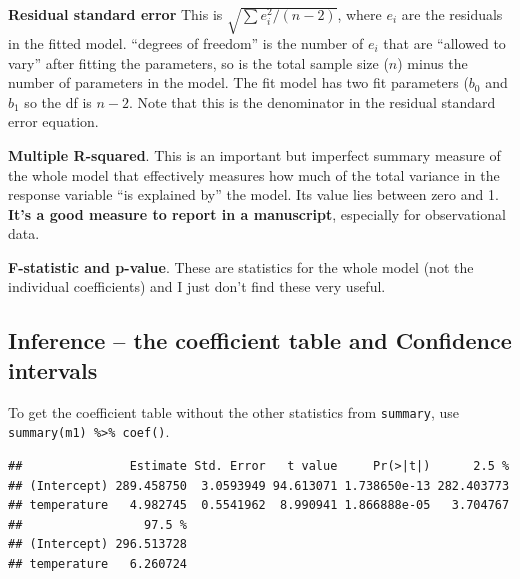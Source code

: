 \documentclass[]{book}
\newenvironment{Shaded}{\begin{snugshade}}{\end{snugshade}}
\newcommand{\KeywordTok}[1]{\textcolor[rgb]{0.13,0.29,0.53}{\textbf{#1}}}
\newcommand{\NormalTok}[1]{#1}
\newcommand{\OperatorTok}[1]{\textcolor[rgb]{0.81,0.36,0.00}{\textbf{#1}}}
\newcommand{\StringTok}[1]{\textcolor[rgb]{0.31,0.60,0.02}{#1}}
\begin{document}
\textbf{Residual standard error} This is \(\sqrt{\sum{e_i^2}/(n-2)}\), where \(e_i\) are the residuals in the fitted model. ``degrees of freedom'' is the number of \(e_i\) that are ``allowed to vary'' after fitting the parameters, so is the total sample size (\(n\)) minus the number of parameters in the model. The fit model has two fit parameters (\(b_0\) and \(b_1\) so the df is \(n-2\). Note that this is the denominator in the residual standard error equation.

\textbf{Multiple R-squared}. This is an important but imperfect summary measure of the whole model that effectively measures how much of the total variance in the response variable ``is explained by'' the model. Its value lies between zero and 1. \textbf{It's a good measure to report in a manuscript}, especially for observational data.

\textbf{F-statistic and p-value}. These are statistics for the whole model (not the individual coefficients) and I just don't find these very useful.

\hypertarget{inference-the-coefficient-table-and-confidence-intervals}{%
\subsection{Inference -- the coefficient table and Confidence intervals}\label{inference-the-coefficient-table-and-confidence-intervals}}

To get the coefficient table without the other statistics from \texttt{summary}, use \texttt{summary(m1)\ \%\textgreater{}\%\ coef()}.

\begin{Shaded}
\end{Shaded}

\begin{verbatim}
##               Estimate Std. Error   t value     Pr(>|t|)      2.5 %
## (Intercept) 289.458750  3.0593949 94.613071 1.738650e-13 282.403773
## temperature   4.982745  0.5541962  8.990941 1.866888e-05   3.704767
##                 97.5 %
## (Intercept) 296.513728
## temperature   6.260724
\end{verbatim}
\end{document}
